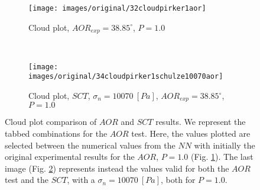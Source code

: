 \begin{figure}[htp] \centering
    \begin{subfigure}[b]{0.96\columnwidth}
        \texttt{[image: images/original/32cloudpirker1aor]}
        \caption{Cloud plot, $AOR_{exp} = 38.85 ^\circ$, $P=1.0$}
        \label{fig:32cloudpirker1aor} 
    \end{subfigure}\\
    \begin{subfigure}[b]{0.96\columnwidth}
        \texttt{[image: images/original/34cloudpirker1schulze10070aor]}
        \caption{Cloud plot, $SCT$, $\sigma_n=10070 ~[Pa]$, $AOR_{exp} = 38.85
        ^\circ$, $P=1.0$}
        \label{fig:34cloudpirker1schulze10070aor} 
    \end{subfigure}
    \caption[Cloud plot comparison of AOR and SCT results]{Cloud plot comparison
    of $AOR$ and $SCT$ results. We represent the tabbed combinations for the
    $AOR$ test.
    Here, the values plotted are selected between the numerical
    values from the $NN$ with initially the original experimental results for
    the $AOR$, $P=1.0$ (Fig.
    \ref{fig:32cloudpirker1aor}). 
    The last image (Fig. \ref{fig:34cloudpirker1schulze10070aor}) represents
    instead the values valid for both the $AOR$ test and the $SCT$, with a
    $\sigma_n=10070 ~[Pa]$, both for $P=1.0$. }
    \label{fig:35schulze10070aorradarandcloud}
\end{figure}